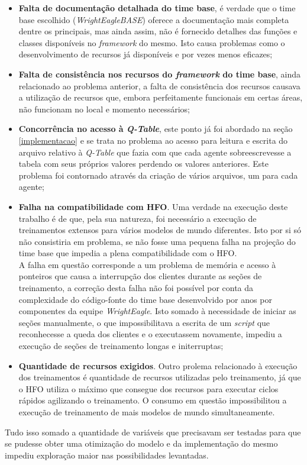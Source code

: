 \begin{itemize}
    \item \textbf{Falta de documentação detalhada do time base}, é verdade que o
    time base escolhido (\textit{WrightEagleBASE}) oferece a
    documentação mais completa dentre os principais, mas ainda assim, não é
    fornecido detalhes das funções e classes disponíveis no \textit{framework}
    do mesmo. Isto causa problemas como o desenvolvimento de recursos já
    disponíveis e por vezes menos eficazes;
    \item \textbf{Falta de consistência nos recursos do \textit{framework} do
    time base}, ainda relacionado ao problema anterior, a falta de consistência
    dos recursos causava a utilização de recursos que, embora perfeitamente
    funcionais em certas áreas, não funcionam no local e momento necessários;
    \item \textbf{Concorrência no acesso à \textit{Q-Table}}, este ponto já foi
    abordado na seção \ref{implementacao} e se trata no problema ao acesso para
    leitura e escrita do arquivo relativo à \textit{Q-Table} que fazia com que
    cada agente sobreescrevesse a tabela com seus próprios valores perdendo os
    valores anteriores. Este problema foi contornado através da criação de
    vários arquivos, um para cada agente;
    \item \textbf{Falha na compatibilidade com HFO}. Uma verdade na execução deste trabalho é de que,
    pela sua natureza, foi necessário a execução de treinamentos extensos para
    vários modelos de mundo diferentes. Isto por si só não consistiria em problema, se não
    fosse uma pequena falha na projeção do time base que impedia a plena
    compatibilidade com o HFO. \\
    A falha em questão corresponde a um problema de memória e acesso à ponteiros que
    causa a interrupção dos clientes durante as seções de treinamento, a correção
    desta falha não foi possível por conta da complexidade do código-fonte do time
    base desenvolvido por anos por componentes da equipe \textit{WrightEagle}. Isto
    somado à necessidade de iniciar as seções manualmente, o que impossibilitava a
    escrita de um \textit{script} que reconhecesse a queda dos clientes e o
    executassem novamente, impediu a execução de seções de treinamento longas e
    initerruptas;
    \item \textbf{Quantidade de recursos exigidos}. Outro prolema relacionado à execução dos treinamentos é quantidade de recursos
    utilizadas pelo treinamento, já que o HFO utiliza o máximo que consegue dos
    recursos para executar ciclos rápidos agilizando o treinamento. O consumo em
    questão impossibilitou a execução de treinamento de mais modelos de mundo
    simultaneamente.
\end{itemize}

Tudo isso somado a quantidade de variáveis que precisavam ser testadas para que
se pudesse obter uma otimização do modelo e da implementação do mesmo impediu
exploração maior nas possibilidades levantadas.